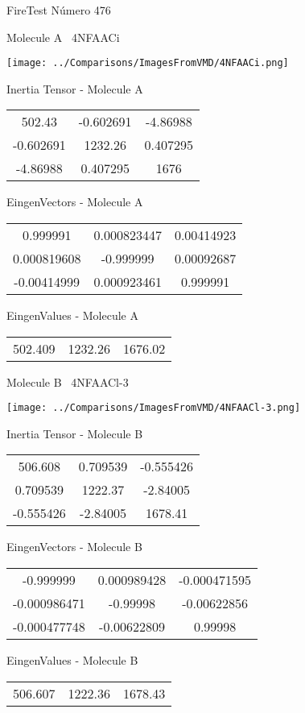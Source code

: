 \vtab[-3cm]
\begin{center}
{\large FireTest \tab Número 476}
\end{center}
\begin{multicols}{2}
\begin{center}

Molecule A \
4NFAACi

\texttt{[image: ../Comparisons/ImagesFromVMD/4NFAACi.png]}

Inertia Tensor - Molecule A \\
\begin{tabular}{|c c c|}
502.43	 & 	-0.602691	 & 	-4.86988	 \\
-0.602691	 & 	1232.26	 & 	0.407295	 \\
-4.86988	 & 	0.407295	 & 	1676
\end{tabular}

\vtab
 EingenVectors - Molecule A     \\
\begin{tabular}{|c c c|}
0.999991	 & 	0.000823447	 & 	0.00414923	 \\
0.000819608	 & 	-0.999999	 & 	0.00092687	 \\
-0.00414999	 & 	0.000923461	 & 	0.999991
\end{tabular}

\vtab
 EingenValues - Molecule A     \\
\begin{tabular}{|c c c|}
502.409	 & 	1232.26	 & 	1676.02	 \\
\end{tabular}
\columnbreak

Molecule B \
4NFAACl-3

\texttt{[image: ../Comparisons/ImagesFromVMD/4NFAACl-3.png]}

Inertia Tensor - Molecule B \\
\begin{tabular}{|c c c|}
506.608	 & 	0.709539	 & 	-0.555426	 \\
0.709539	 & 	1222.37	 & 	-2.84005	 \\
-0.555426	 & 	-2.84005	 & 	1678.41
\end{tabular}

\vtab
 EingenVectors - Molecule B     \\
\begin{tabular}{|c c c|}
-0.999999	 & 	0.000989428	 & 	-0.000471595	 \\
-0.000986471	 & 	-0.99998	 & 	-0.00622856	 \\
-0.000477748	 & 	-0.00622809	 & 	0.99998
\end{tabular}

\vtab
 EingenValues - Molecule B     \\
\begin{tabular}{|c c c|}
506.607	 & 	1222.36	 & 	1678.43	 \\
\end{tabular}

\end{center}
\end{multicols}

